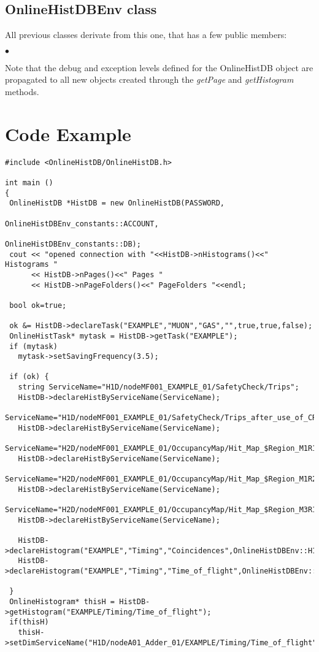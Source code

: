 \documentclass{lhcbnote}
\begin{document}
\subsection{OnlineHistDBEnv class}\label{dbenvclass}
All previous classes derivate from this one, that has a few public
members:
\begin{list}{$\bullet$}{}

\end{list}

Note that the debug and exception levels defined for the OnlineHistDB object are
propagated to all new objects created through the {\it getPage} and
{\it getHistogram} methods.



\section{Code Example}

\begin{verbatim}
#include <OnlineHistDB/OnlineHistDB.h>

int main ()
{
 OnlineHistDB *HistDB = new OnlineHistDB(PASSWORD,
                                        OnlineHistDBEnv_constants::ACCOUNT,
                                        OnlineHistDBEnv_constants::DB);
 cout << "opened connection with "<<HistDB->nHistograms()<<" Histograms "
      << HistDB->nPages()<<" Pages "
      << HistDB->nPageFolders()<<" PageFolders "<<endl;
    
 bool ok=true;
  
 ok &= HistDB->declareTask("EXAMPLE","MUON","GAS","",true,true,false);
 OnlineHistTask* mytask = HistDB->getTask("EXAMPLE");
 if (mytask)
   mytask->setSavingFrequency(3.5);
  
 if (ok) {
   string ServiceName="H1D/nodeMF001_EXAMPLE_01/SafetyCheck/Trips";
   HistDB->declareHistByServiceName(ServiceName);
   ServiceName="H1D/nodeMF001_EXAMPLE_01/SafetyCheck/Trips_after_use_of_CRack";
   HistDB->declareHistByServiceName(ServiceName);
   ServiceName="H2D/nodeMF001_EXAMPLE_01/OccupancyMap/Hit_Map_$Region_M1R1";
   HistDB->declareHistByServiceName(ServiceName); 
   ServiceName="H2D/nodeMF001_EXAMPLE_01/OccupancyMap/Hit_Map_$Region_M1R2";
   HistDB->declareHistByServiceName(ServiceName);
   ServiceName="H2D/nodeMF001_EXAMPLE_01/OccupancyMap/Hit_Map_$Region_M3R1";
   HistDB->declareHistByServiceName(ServiceName);
   
   HistDB->declareHistogram("EXAMPLE","Timing","Coincidences",OnlineHistDBEnv::H1D);
   HistDB->declareHistogram("EXAMPLE","Timing","Time_of_flight",OnlineHistDBEnv::H1D);
   
 }
 OnlineHistogram* thisH = HistDB->getHistogram("EXAMPLE/Timing/Time_of_flight");
 if(thisH)
   thisH->setDimServiceName("H1D/nodeA01_Adder_01/EXAMPLE/Timing/Time_of_flight");
\end{verbatim}
\end{document}
